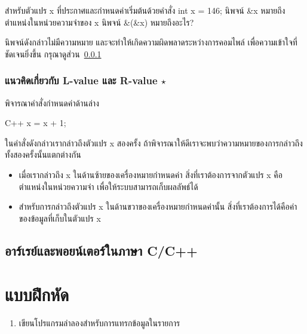 \begin{quiz}{}
สำหรับ{\wbr}ตัวแปร {\ct x} ที่{\wbr}ประกาศ{\wbr}และ{\wbr}กำหนด{\wbr}ค่า{\wbr}เริ่มต้น{\wbr}ด้วย{\wbr}คำสั่ง {\ct int x = 146;}
นิพจน์ {\ct \&x} หมายถึง{\wbr}ตำแหน่ง{\wbr}ใน{\wbr}หน่วยความจำ{\wbr}ของ {\ct x} นิพจน์ {\ct \&(\&x)} หมายถึง{\wbr}อะไร?
\end{quiz}
\begin{quizans}
นิพจน์{\wbr}ดังกล่าว{\wbr}ไม่{\wbr}มี{\wbr}ความหมาย และ{\wbr}จะ{\wbr}ทำ{\wbr}ให้{\wbr}เกิด{\wbr}ความผิด{\wbr}พลาด{\wbr}ระหว่าง{\wbr}การ{\wbr}คอมไพล์{\wbr}
เพื่อ{\wbr}ความ{\wbr}เข้าใจ{\wbr}ที่{\wbr}ชัดเจน{\wbr}ยิ่ง{\wbr}ขึ้น กรุณา{\wbr}ดู{\wbr}ส่วน~\ref{sect:array-lval-rval}
\end{quizans}

\subsubsection{แนว{\wbr}คิด{\wbr}เกี่ยวกับ L-value และ R-value $\star$}
\label{sect:array-lval-rval}

พิจารณา{\wbr}คำสั่ง{\wbr}กำหนด{\wbr}ค่า{\wbr}ด้าน{\wbr}ล่าง{\wbr}

\latintext
\begin{codelist}{C++}{}
x = x + 1;
\end{codelist}
\thaitext

ใน{\wbr}คำสั่ง{\wbr}ดังกล่าว{\wbr}เรา{\wbr}กล่าว{\wbr}ถึง{\wbr}ตัวแปร {\ct x} สอง{\wbr}ครั้ง{\wbr}
ถ้า{\wbr}พิจารณา{\wbr}ให้{\wbr}ดี{\wbr}เรา{\wbr}จะ{\wbr}พบ{\wbr}ว่าความ{\wbr}หมาย{\wbr}ของ{\wbr}การ{\wbr}กล่าว{\wbr}ถึง{\wbr}ทั้ง{\wbr}สอง{\wbr}ครั้งนั้น{\wbr}แตกต่าง{\wbr}กัน{\wbr}

\begin{itemize}
\item เมื่อ{\wbr}เรา{\wbr}กล่าว{\wbr}ถึง {\ct x} ใน{\wbr}ด้าน{\wbr}ซ้าย{\wbr}ของ{\wbr}เครื่องหมาย{\wbr}กำหนด{\wbr}ค่า{\wbr}
  สิ่ง{\wbr}ที่{\wbr}เรา{\wbr}ต้องการ{\wbr}จาก{\wbr}ตัวแปร {\ct x} คือ{\wbr}ตำแหน่ง{\wbr}ใน{\wbr}หน่วยความจำ{\wbr}
  เพื่อให้{\wbr}ระบบ{\wbr}สามารถ{\wbr}เก็บ{\wbr}ผลลัพธ์{\wbr}ได้{\wbr}
\item สำหรับ{\wbr}การ{\wbr}กล่าว{\wbr}ถึง{\wbr}ตัวแปร {\ct x} ใน{\wbr}ด้าน{\wbr}ขวา{\wbr}ของ{\wbr}เครื่องหมาย{\wbr}กำหนด{\wbr}ค่า{\wbr}นั้น{\wbr}
  สิ่ง{\wbr}ที่{\wbr}เรา{\wbr}ต้องการ{\wbr}ได้{\wbr}คือ{\wbr}ค่า{\wbr}ของ{\wbr}ข้อมูล{\wbr}ที่{\wbr}เก็บ{\wbr}ใน{\wbr}ตัวแปร {\ct x}
\end{itemize}

\subsection{อาร์เรย์{\wbr}และ{\wbr}พอยน์เตอร์{\wbr}ใน{\wbr}ภาษา C/C++}
\label{sect:array-array-pointer-c}

\section{แบบฝึกหัด}

\begin{enumerate}
\item เขียน{\wbr}โปรแกรม{\wbr}ลำ{\wbr}ลอง{\wbr}สำหรับ{\wbr}การ{\wbr}แทรก{\wbr}ข้อมูล{\wbr}ใน{\wbr}รายการ{\wbr}
\end{enumerate}
